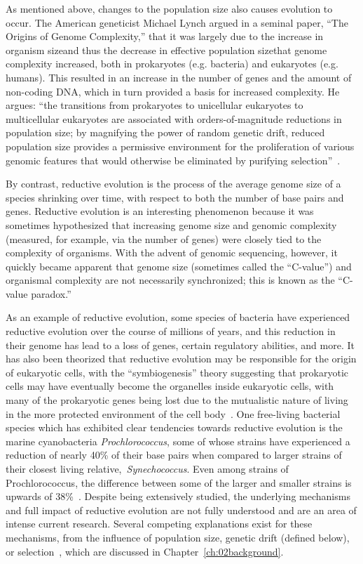 As mentioned above, changes to the population size also causes evolution to occur. The American geneticist Michael Lynch argued in a seminal paper, ``The Origins of Genome Complexity,'' that it was largely due to the increase in organism size\textemdash and thus the decrease in effective population size\textemdash that genome complexity increased, both in prokaryotes (e.g. bacteria) and eukaryotes (e.g. humans). This resulted in an increase in the number of genes and the amount of non-coding DNA, which in turn provided a basis for increased complexity. He argues: ``the transitions from prokaryotes to unicellular eukaryotes to multicellular eukaryotes are associated with orders-of-magnitude reductions in population size; by magnifying the power of random genetic drift, reduced population size provides a permissive environment for the proliferation of various genomic features that would otherwise be eliminated by purifying selection''~\cite{Lynch1401}. 

By contrast, reductive evolution is the process of the average genome size of a species shrinking over time, with respect to both the number of base pairs and genes. Reductive evolution is an interesting phenomenon because it was sometimes hypothesized that increasing genome size and genomic complexity (measured, for example, via the number of genes) were closely tied to the complexity of organisms. With the advent of genomic sequencing, however, it quickly became apparent that genome size (sometimes called the ``C-value'') and organismal complexity are not necessarily synchronized; this is known as the ``C-value paradox.'' 

As an example of reductive evolution, some species of bacteria have experienced reductive evolution over the course of millions of years, and this reduction in their genome has lead to a loss of genes, certain regulatory abilities, and more. It has also been theorized that reductive evolution may be responsible for the origin of eukaryotic cells, with the ``symbiogenesis'' theory suggesting that prokaryotic cells may have eventually become the organelles inside eukaryotic cells, with many of the prokaryotic genes being lost due to the mutualistic nature of living in the more protected environment of the cell body~\cite{sagan1967origin}. One free-living bacterial species which has exhibited clear tendencies towards reductive evolution is the marine cyanobacteria \textit{Prochlorococcus}, some of whose strains have experienced a reduction of nearly 40\% of their base pairs when compared to larger strains of their closest living relative,~\textit{Synechococcus}. Even among strains of Prochlorococcus, the difference between some of the larger and smaller strains is upwards of 38\%~\cite{Batut.2014}. Despite being extensively studied, the underlying mechanisms and full impact of reductive evolution are not fully understood and are an area of intense current research. Several competing explanations exist for these mechanisms, from the influence of population size, genetic drift (defined below), or selection~\cite{Batut.2014}, which are discussed in Chapter~\ref{ch:02background}. 

